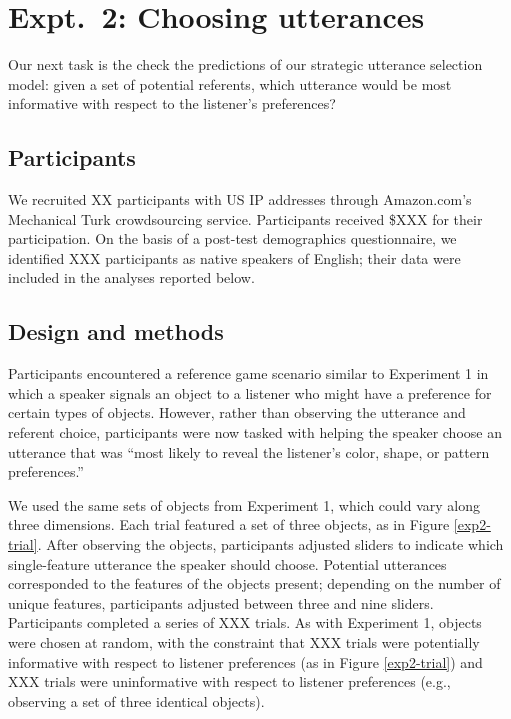 \documentclass[10pt,a4paper]{article}
\begin{document}
\section{Expt.~2: Choosing utterances}

Our next task is the check the predictions of our strategic utterance selection model: given a set of potential referents, which utterance would be most informative with respect to the listener's preferences?

\subsection{Participants}

We recruited XX participants with US IP addresses through Amazon.com's Mechanical Turk crowdsourcing service. Participants received \$XXX for their participation. On the basis of a post-test demographics questionnaire, we identified XXX participants as native speakers of English; their data were included in the analyses reported below.

\subsection{Design and methods}

Participants encountered a reference game scenario similar to Experiment 1 in which a speaker signals an object to a listener who might have a preference for certain types of objects. However, rather than observing the utterance and referent choice, participants were now tasked with helping the speaker choose an utterance that was ``most likely to reveal the listener's color, shape, or pattern preferences.''

We used the same sets of objects from Experiment 1, which could vary along three dimensions. Each trial featured a set of three objects, as in Figure \ref{exp2-trial}. After observing the objects, participants adjusted sliders to indicate which single-feature utterance the speaker should choose. Potential utterances corresponded to the features of the objects present; depending on the number of unique features, participants adjusted between three and nine sliders. Participants completed a series of XXX trials. As with Experiment 1, objects were chosen at random, with the constraint that XXX trials were potentially informative with respect to listener preferences (as in Figure \ref{exp2-trial}) and XXX trials were uninformative with respect to listener preferences (e.g., observing a set of three identical objects). 
\end{document}
